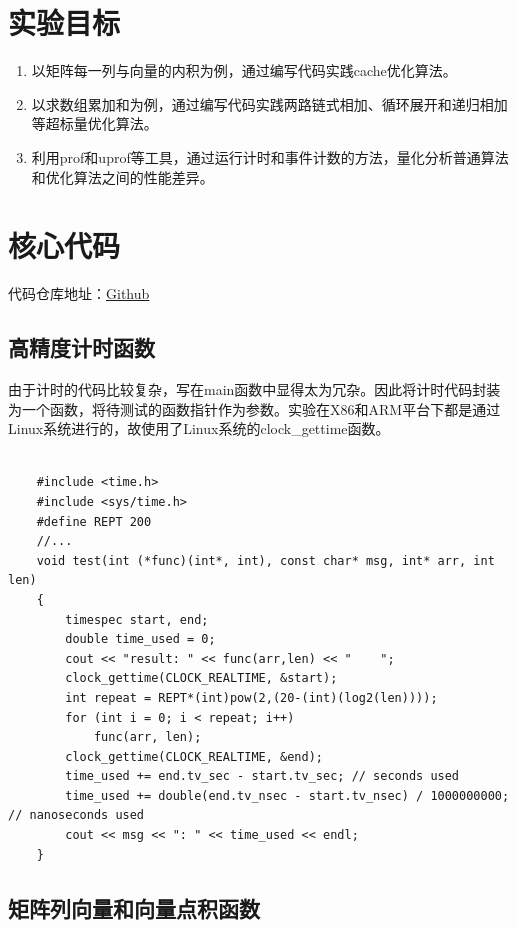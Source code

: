 \documentclass[a4paper]{article}
\begin{document}
\section{实验目标}
\begin{enumerate}
  \item 以矩阵每一列与向量的内积为例，通过编写代码实践cache优化算法。
  \item 以求数组累加和为例，通过编写代码实践两路链式相加、循环展开和递归相加等超标量优化算法。
  \item 利用prof和uprof等工具，通过运行计时和事件计数的方法，量化分析普通算法和优化算法之间的性能差异。
\end{enumerate}

\section{核心代码}
代码仓库地址：\href{https://github.com/suhipek/NKU_parallel_programming/tree/main/2_cache_superscalar_profiling}{Github}

\subsection{高精度计时函数}
由于计时的代码比较复杂，写在main函数中显得太为冗杂。因此将计时代码封装为一个函数，将待测试的函数指针作为参数。实验在X86和ARM平台下都是通过Linux系统进行的，故使用了Linux系统的clock\_gettime函数。
\begin{verbatim}
               
    #include <time.h>
    #include <sys/time.h>
    #define REPT 200
    //...
    void test(int (*func)(int*, int), const char* msg, int* arr, int len)
    {
        timespec start, end;
        double time_used = 0;
        cout << "result: " << func(arr,len) << "    ";
        clock_gettime(CLOCK_REALTIME, &start);
        int repeat = REPT*(int)pow(2,(20-(int)(log2(len))));
        for (int i = 0; i < repeat; i++)
            func(arr, len);
        clock_gettime(CLOCK_REALTIME, &end);
        time_used += end.tv_sec - start.tv_sec; // seconds used
        time_used += double(end.tv_nsec - start.tv_nsec) / 1000000000; // nanoseconds used
        cout << msg << ": " << time_used << endl;
    }
\end{verbatim}

\subsection{矩阵列向量和向量点积函数}
\end{document}
